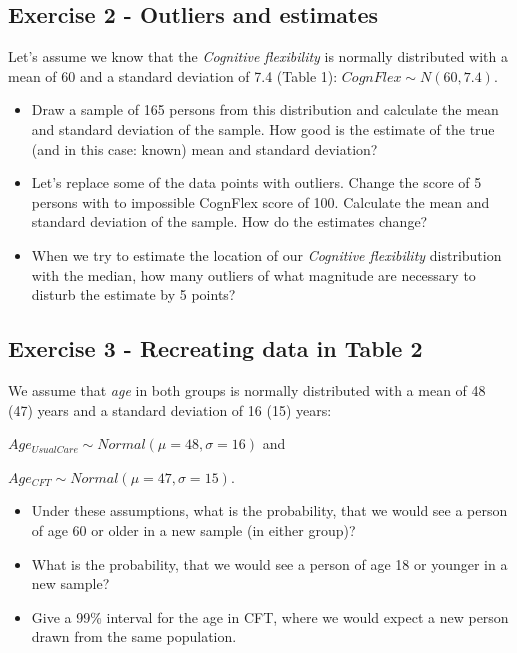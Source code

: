 \documentclass[
]{book}
\providecommand{\tightlist}{%
  \setlength{\itemsep}{0pt}\setlength{\parskip}{0pt}}
\begin{document}
\subsection{Exercise 2 - Outliers and estimates}\label{exercise-2---outliers-and-estimates}

Let's assume we know that the \emph{Cognitive flexibility} is normally distributed with a mean of 60 and a standard deviation of 7.4 (Table 1): \(CognFlex \sim N(60,7.4)\).

\begin{itemize}
\tightlist
\item
  Draw a sample of 165 persons from this distribution and calculate the mean and standard deviation of the sample.
  How good is the estimate of the true (and in this case: known) mean and standard deviation?
\item
  Let's replace some of the data points with outliers. Change the score of 5 persons with to impossible CognFlex score of 100.
  Calculate the mean and standard deviation of the sample. How do the estimates change?
\item
  When we try to estimate the location of our \emph{Cognitive flexibility} distribution with the median,
  how many outliers of what magnitude are necessary to disturb the estimate by 5 points?
\end{itemize}

\subsection{Exercise 3 - Recreating data in Table 2}\label{exercise3_descriptive_stats}

We assume that \emph{age} in both groups is normally distributed with a mean of 48 (47) years
and a standard deviation of 16 (15) years:

\(Age_{UsualCare} \sim Normal(\mu = 48, \sigma = 16)\) and

\(Age_{CFT} \sim Normal(\mu = 47,\sigma = 15)\).

\begin{itemize}
\tightlist
\item
  Under these assumptions, what is the probability, that we would see a person of age 60 or older in a new sample (in either group)?
\item
  What is the probability, that we would see a person of age 18 or younger in a new sample?
\item
  Give a 99\% interval for the age in CFT,
  where we would expect a new person drawn from the same population.
\end{itemize}
\end{document}
